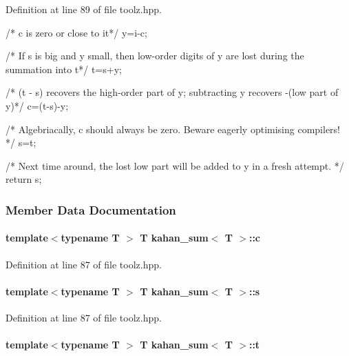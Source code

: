 \-Definition at line 89 of file toolz.\-hpp.


\begin{DoxyCode}
  {
    /* c is zero or close to it*/
    y=i-c;

    /* If s is big and y small, then low-order digits of y are lost during
    the summation into t*/
    t=s+y;

    /* (t - s) recovers the high-order part of y; subtracting y
      recovers -(low part of y)*/
    c=(t-s)-y;

    /* Algebriacally, c should always be zero. Beware eagerly optimising
      compilers! */
    s=t;

    /* Next time around, the lost low part will be added to y in a fresh
      attempt. */
    return s;
  }
\end{DoxyCode}


\subsubsection{\-Member \-Data \-Documentation}
\hypertarget{structkahan__sum_afab4196ad7b7070a3419edf6a22ed38c}{
\paragraph[{c}]{\setlength{\rightskip}{0pt plus 5cm}template$<$typename T $>$ \-T {\bf kahan\-\_\-sum}$<$ \-T $>$\-::{\bf c}}}\label{structkahan__sum_afab4196ad7b7070a3419edf6a22ed38c}


\-Definition at line 87 of file toolz.\-hpp.

\hypertarget{structkahan__sum_ae1b273e1cd734166b0840102e0392c3f}{
\paragraph[{s}]{\setlength{\rightskip}{0pt plus 5cm}template$<$typename T $>$ \-T {\bf kahan\-\_\-sum}$<$ \-T $>$\-::{\bf s}}}\label{structkahan__sum_ae1b273e1cd734166b0840102e0392c3f}


\-Definition at line 87 of file toolz.\-hpp.

\hypertarget{structkahan__sum_a5a398ccf917c6235b89762261c7bdb77}{
\paragraph[{t}]{\setlength{\rightskip}{0pt plus 5cm}template$<$typename T $>$ \-T {\bf kahan\-\_\-sum}$<$ \-T $>$\-::{\bf t}}}\label{structkahan__sum_a5a398ccf917c6235b89762261c7bdb77}


